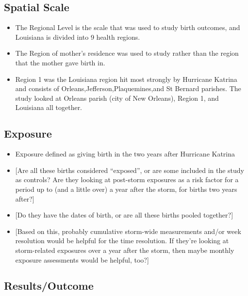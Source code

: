 \documentclass[
]{article}
\providecommand{\tightlist}{%
  \setlength{\itemsep}{0pt}\setlength{\parskip}{0pt}}
\begin{document}
\hypertarget{spatial-scale-14}{%
\subsection{Spatial Scale}\label{spatial-scale-14}}

\begin{itemize}
\tightlist
\item
  The Regional Level is the scale that was used to study birth outcomes,
  and Louisiana is divided into 9 health regions.
\item
  The Region of mother's residence was used to study rather than the
  region that the mother gave birth in.
\item
  Region 1 was the Louisiana region hit most strongly by Hurricane
  Katrina and consists of Orleans,Jefferson,Plaquemines,and St Bernard
  parishes. The study looked at Orleans parish (city of New Orleans),
  Region 1, and Louisiana all together.
\end{itemize}

\hypertarget{exposure-13}{%
\subsection{Exposure}\label{exposure-13}}

\begin{itemize}
\tightlist
\item
  Exposure defined as giving birth in the two years after Hurricane
  Katrina
\item
  {[}Are all these births considered ``exposed'', or are some included
  in the study as controls? Are they looking at post-storm exposures as
  a risk factor for a period up to (and a little over) a year after the
  storm, for births two years after?{]}
\item
  {[}Do they have the dates of birth, or are all these births pooled
  together?{]}
\item
  {[}Based on this, probably cumulative storm-wide measurements and/or
  week resolution would be helpful for the time resolution. If they're
  looking at storm-related exposures over a year after the storm, then
  maybe monthly exposure assessments would be helpful, too?{]}
\end{itemize}

\hypertarget{resultsoutcome}{%
\subsection{Results/Outcome}\label{resultsoutcome}}
\end{document}
